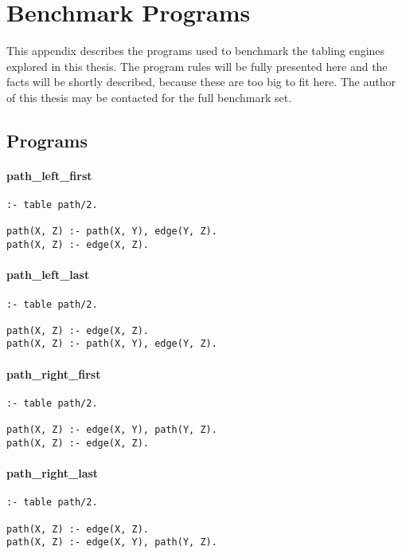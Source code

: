 \chapter{Benchmark Programs}\label{app:code}

This appendix describes the programs used to benchmark the tabling engines
explored in this thesis. The program rules will be fully presented here and
the facts will be shortly described, because these are too big to fit here.
The author of this thesis may be contacted for the full benchmark set.

\section{Programs}

\subsubsection*{path\_left\_first}

\begin{Verbatim}
:- table path/2.

path(X, Z) :- path(X, Y), edge(Y, Z).
path(X, Z) :- edge(X, Z).
\end{Verbatim}

\subsubsection*{path\_left\_last}

\begin{Verbatim}
:- table path/2.

path(X, Z) :- edge(X, Z).
path(X, Z) :- path(X, Y), edge(Y, Z).
\end{Verbatim}

\subsubsection*{path\_right\_first}

\begin{Verbatim}
:- table path/2.

path(X, Z) :- edge(X, Y), path(Y, Z).
path(X, Z) :- edge(X, Z).
\end{Verbatim}

\subsubsection*{path\_right\_last}

\begin{Verbatim}
:- table path/2.

path(X, Z) :- edge(X, Z).
path(X, Z) :- edge(X, Y), path(Y, Z).
\end{Verbatim}

